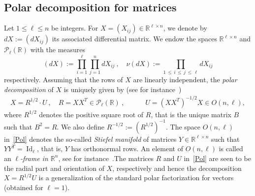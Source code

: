 \documentclass[10pt]{amsart}
\theoremstyle{definition}\newtheorem{defi}[theo]{Definition}\newtheorem{rema}[theo]{Remark}\newtheorem{exam}[theo]{Example}\newtheorem{exem}[theo]{Example}\newtheorem{nota}[theo]{Notation}
\DeclareMathOperator{\Id}{Id}
\newcommand{\clP}{\mathcal{P}}
\newcommand{\R}{\mathbb{R}}
\begin{document}
\subsection{Polar decomposition for matrices}\label{SecPD}

Let $1\leq \ell \leq n$ be integers. For $X=(X_{ij}) \in \R^{\ell \times n}$, we denote by $dX:=(dX_{ij})$ its associated differential matrix. We endow the spaces $\R^{\ell \times n}$ and $\clP_{\ell}(\R)$ with the measures
\[
(dX) := \prod_{i=1}^{\ell}\prod_{j=1}^{n} dX_{ij} \ , \quad
\nu(dX) := \prod_{1\,\leq\,i\,\leq\,j\,\leq\,\ell} dX_{ij}
\]
respectively. Assuming that the rows of $X$ are linearly independent, the \emph{polar decomposition} of $X$ is uniquely given by (see for instance~\cite{Downs})
\begin{gather}\label{Pol}
X = R^{1/2} \cdot U \ , \quad R = XX^T \in \clP_{\ell}(\R) \ , \quad
\qquad U = \left(XX^T\right)^{-1/2}X \in O(n,\ell),
\end{gather}
where $R^{1/2}$ denotes the positive square root of $R$, that is the unique matrix $B$ such that $B^2=R$. We also define $R^{-1/2}:=(R^{1/2})^{-1}$. The space $O(n,\ell)$ in~\eqref{Pol} denotes the so-called \emph{Stiefel manifold} of matrices $Y \in \R^{\ell \times n}$ such that $YY^T= \Id_{\ell}$, that is, $Y$ has orthonormal rows. An element of $O(n,\ell)$ is called an \emph{$\ell$-frame in $\R^n$}, see for instance~\cite[p.~8]{Ch2012}.The matrices $R$ and $U$ in~\eqref{Pol} are seen to be the radial part and orientation of $X$, respectively and hence the decomposition $X=R^{1/2}U$ is a generalization of the standard polar factorization for vectors (obtained for $\ell=1$).
\end{document}
